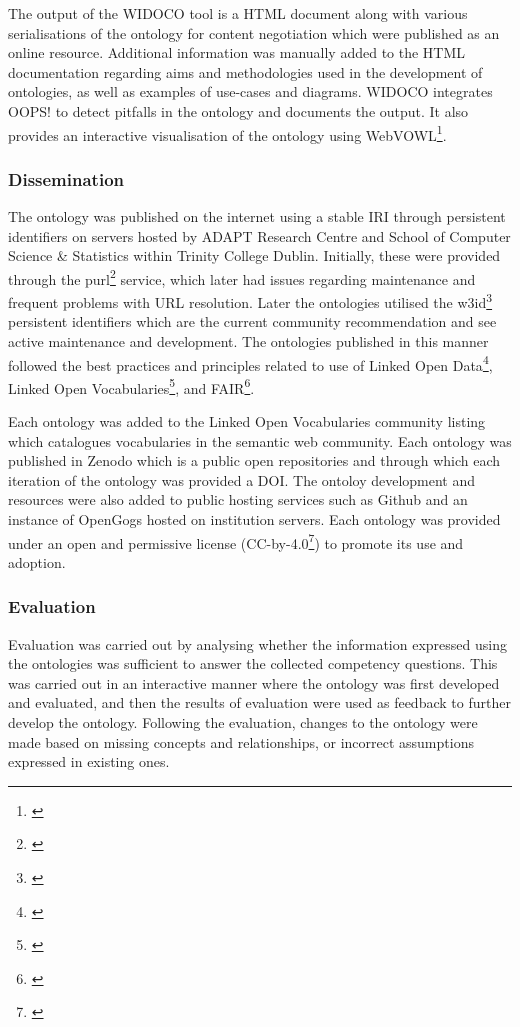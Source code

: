 The output of the WIDOCO tool is a HTML document along with various serialisations of the ontology for content negotiation which were published as an online resource. Additional information was manually added to the HTML documentation regarding aims and methodologies used in the development of ontologies, as well as examples of use-cases and diagrams. WIDOCO integrates OOPS! to detect pitfalls in the ontology and documents the output. It also provides an interactive visualisation of the ontology using WebVOWL\footnote{\url{}}.

\subsubsection*{Dissemination}
The ontology was published on the internet using a stable IRI through persistent identifiers on servers hosted by ADAPT Research Centre and School of Computer Science \& Statistics within Trinity College Dublin. Initially, these were provided through the purl\footnote{\url{}} service, which later had issues regarding maintenance and frequent problems with URL resolution. Later the ontologies utilised the w3id\footnote{\url{}} persistent identifiers which are the current community recommendation and see active maintenance and development. The ontologies published in this manner followed the best practices and principles related to use of Linked Open Data\footnote{\url{}}, Linked Open Vocabularies\footnote{\url{}}, and FAIR\footnote{\url{}}.

Each ontology was added to the Linked Open Vocabularies community listing which catalogues vocabularies in the semantic web community. Each ontology was published in Zenodo which is a public open repositories and through which each iteration of the ontology was provided a DOI. The ontoloy development and resources were also added to public hosting services such as Github and an instance of OpenGogs hosted on institution servers. Each ontology was provided under an open and permissive license (CC-by-4.0\footnote{\url{}}) to promote its use and adoption.

\subsubsection*{Evaluation}
Evaluation was carried out by analysing whether the information expressed using the ontologies was sufficient to answer the collected competency questions. This was carried out in an interactive manner where the ontology was first developed and evaluated, and then the results of evaluation were used as feedback to further develop the ontology. Following the evaluation, changes to the ontology were made based on missing concepts and relationships, or incorrect assumptions expressed in existing ones. 

